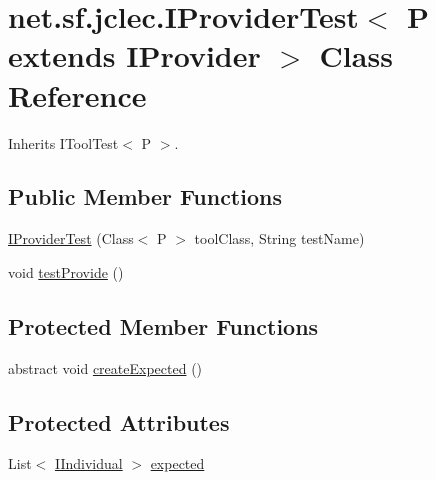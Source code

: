\hypertarget{classnet_1_1sf_1_1jclec_1_1_i_provider_test_3_01_p_01extends_01_i_provider_01_4}{\section{net.\-sf.\-jclec.\-I\-Provider\-Test$<$ P extends I\-Provider $>$ Class Reference}
\label{classnet_1_1sf_1_1jclec_1_1_i_provider_test_3_01_p_01extends_01_i_provider_01_4}
}


Inherits I\-Tool\-Test$<$ P $>$.

\subsection*{Public Member Functions}
\begin{DoxyCompactItemize}
\item 
\hyperlink{classnet_1_1sf_1_1jclec_1_1_i_provider_test_3_01_p_01extends_01_i_provider_01_4_a247eae1211a55a93dd928b85b3cb103c}{I\-Provider\-Test} (Class$<$ P $>$ tool\-Class, String test\-Name)
\item 
void \hyperlink{classnet_1_1sf_1_1jclec_1_1_i_provider_test_3_01_p_01extends_01_i_provider_01_4_a370d5f3c646c7ab7ab9794716e096966}{test\-Provide} ()
\end{DoxyCompactItemize}
\subsection*{Protected Member Functions}
\begin{DoxyCompactItemize}
\item 
abstract void \hyperlink{classnet_1_1sf_1_1jclec_1_1_i_provider_test_3_01_p_01extends_01_i_provider_01_4_ac70975ec28b518d6a47b67c1a21eda2d}{create\-Expected} ()
\end{DoxyCompactItemize}
\subsection*{Protected Attributes}
\begin{DoxyCompactItemize}
\item 
List$<$ \hyperlink{interfacenet_1_1sf_1_1jclec_1_1_i_individual}{I\-Individual} $>$ \hyperlink{classnet_1_1sf_1_1jclec_1_1_i_provider_test_3_01_p_01extends_01_i_provider_01_4_ae603de3f94b3b1a61bd00abdcffbf5b9}{expected}
\end{DoxyCompactItemize}



